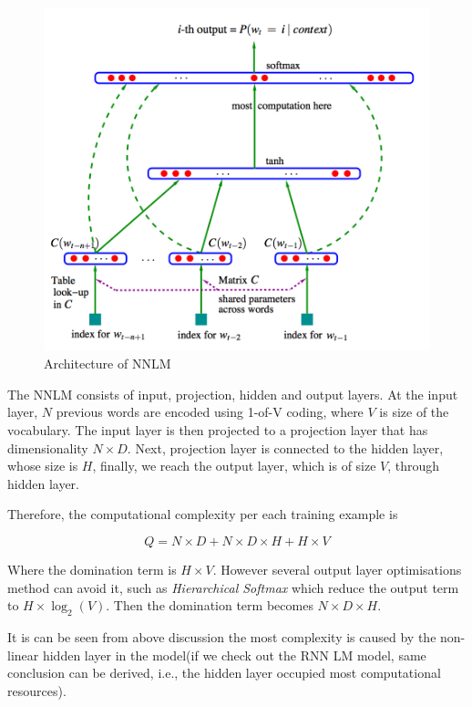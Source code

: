 \documentclass[]{article}
\begin{document}
\begin{figure}[h]\centering\includegraphics[width=\textwidth]{source//images/posts/nnlm.png}\caption{Architecture of NNLM}\label{fig:nnlm}\end{figure}

The NNLM consists of input, projection, hidden and output layers. At the
input layer, \(N\) previous words are encoded using 1-of-V coding, where
\(V\) is size of the vocabulary. The input layer is then projected to a
projection layer that has dimensionality \(N \times D\). Next,
projection layer is connected to the hidden layer, whose size is \(H\),
finally, we reach the output layer, which is of size \(V\), through
hidden layer.

Therefore, the computational complexity per each training example is

\[
Q = N \times D + N \times D \times H + H \times V
\]

Where the domination term is \(H \times V\). However several output
layer optimisations method can avoid it, such as \emph{Hierarchical
Softmax} which reduce the output term to \(H \times \log_2(V)\). Then
the domination term becomes \(N \times D \times H\).

It is can be seen from above discussion the most complexity is caused by
the non-linear hidden layer in the model(if we check out the RNN LM
model, same conclusion can be derived, i.e., the hidden layer occupied
most computational resources).
\end{document}
